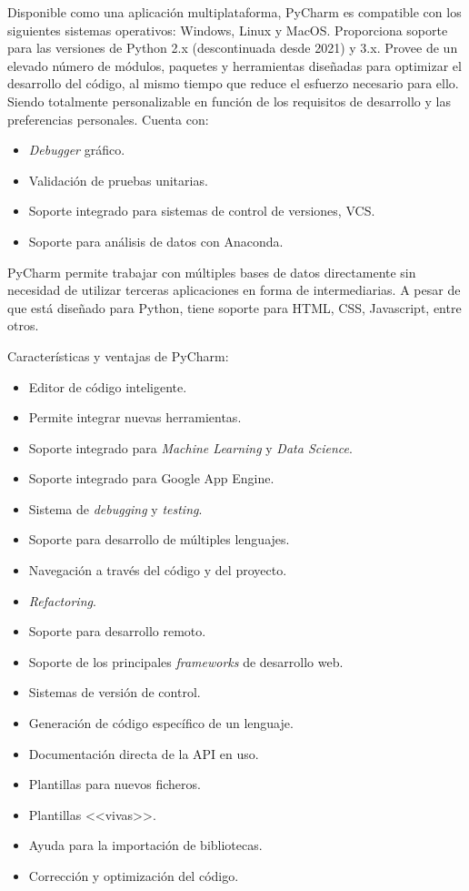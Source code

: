 Disponible como una aplicación multiplataforma, PyCharm es compatible con los siguientes sistemas operativos: Windows, Linux y MacOS. Proporciona soporte para las versiones de Python 2.x (descontinuada desde 2021) y 3.x. Provee de un elevado número de módulos, paquetes y herramientas diseñadas para optimizar el desarrollo del código, al mismo tiempo que reduce el esfuerzo necesario para ello. Siendo totalmente personalizable en función de los requisitos de desarrollo y las preferencias personales. Cuenta con:
\begin{itemize}
\tightlist
\item \textit{Debugger} gráfico.
\item Validación de pruebas unitarias.
\item Soporte integrado para sistemas de control de versiones, VCS.
\item Soporte para análisis de datos con Anaconda.
\end{itemize}
PyCharm permite trabajar con múltiples bases de datos directamente sin necesidad de utilizar terceras aplicaciones en forma de intermediarias. A pesar de que está diseñado para Python, tiene soporte para HTML, CSS, Javascript, entre otros.

Características y ventajas de PyCharm:
\begin{itemize}
\tightlist
\item Editor de código inteligente. 
\item Permite integrar nuevas herramientas.
\item Soporte integrado para \textit{Machine Learning} y \textit{Data Science}.
\item Soporte integrado para Google App Engine.
\item Sistema de \textit{debugging} y \textit{testing}.
\item Soporte para desarrollo de múltiples lenguajes.
\item Navegación a través del código y del proyecto.
\item \textit{Refactoring}.
\item Soporte para desarrollo remoto.
\item Soporte de los principales \textit{frameworks} de desarrollo web.
\item Sistemas de versión de control.
\item Generación de código específico de un lenguaje.
\item Documentación directa de la API en uso.
\item Plantillas para nuevos ficheros.
\item Plantillas <<vivas>>.
\item Ayuda para la importación de bibliotecas.
\item Corrección y optimización del código.
\end{itemize}

